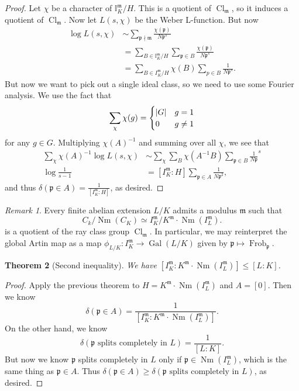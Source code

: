 \documentclass[leqno, openany]{memoir}
\newtheorem{thm}{Theorem}[section]
\theoremstyle{definition}
\theoremstyle{remark}
\newtheorem{rmk}[thm]{Remark}
\theoremstyle{plain}
\theoremstyle{definition}
\theoremstyle{remark}
\newcommand{\I}{\mathbb{I}}
\newcommand{\mf}[1]{\mathfrak{#1}}
\DeclareMathOperator{\Gal}{Gal}
\DeclareMathOperator{\Cl}{Cl}
\DeclareMathOperator{\Nm}{Nm}
\DeclareMathOperator{\Frob}{Frob}
\begin{document}
\begin{proof}
    Let $\chi$ be a character of $\I_K^{\mf{m}}/H$. This is a quotient of $\Cl_{\mf{m}}$, so it induces a quotient of $\Cl_{\mf{m}}$. Now let $L(s, \chi)$ be the Weber L-function. But now 
    \begin{align*} 
        \log L(s, \chi) &\sim \sum_{\mf{p} \nmid \mf{m}} \frac{\chi(\mf{p})}{N\mf{p}^s} \\ 
                        &= \sum_{B \in \I_K^{\mf{m}}/H} \sum_{\mf{p} \in B} \frac{\chi(\mf{p})}{N\mf{p}^s} \\
                        &= \sum_{B \in I_K^{\mf{m}}/H} \chi(B) \sum_{p \in B} \frac{1}{N \mf{p}^s}.
    \end{align*}
    But now we want to pick out a single ideal class, so we need to use some Fourier analysis. We use the fact that
    \[ \sum_{\chi} \chi(g) = \begin{cases}
        \abs{G} & g = 1 \\
        0 & g \neq 1
    \end{cases} \]
    for any $g \in G$. Multiplying ${\chi(A)}^{-1}$ and summing over all $\chi$, we see that
    \begin{align*}
        \sum_{\chi} {\chi(A)}^{-1} \log L(s, \chi) &\sim \sum_{\chi} \sum_B \chi(A^{-1}B) \sum_{\mf{p} \in B} \frac{1}{N \mf{p}}^s \\
        \log \frac{1}{s-1}                         &=[I_K^{\mf{m}}:H] \sum_{\mf{p} \in A} \frac{1}{N \mf{p}^2},
    \end{align*}
    and thus $\delta(\mf{p} \in A) = \frac{1}{[I_K^{\mf{m}}:H]}$, as desired.
\end{proof}

\begin{rmk}
    Every finite abelian extension $L/K$ admits a modulus $\mf{m}$ such that 
    \[ C_k/\Nm(C_K) \simeq I_K^{\mf{m}} / K^{\mf{m}} \cdot \Nm(I_L^{\mf{m}}). \]
    is a quotient of the ray class group $\Cl_{\mf{m}}$. In particular, we may reinterpret the global Artin map as a map $\phi_{L/K} \colon I_K^{\mf{m}} \to \Gal(L/K)$ given by $\mf{p} \mapsto \Frob_{\mf{p}}$.
\end{rmk}

\begin{thm}[Second inequality]
    We have $[I_K^{\mf{m}} : K^{\mf{m}} \cdot \Nm(I_L^{\mf{m}})] \leq [L:K]$.
\end{thm}

\begin{proof}
    Apply the previous theorem to $H = K^{\mf{m}} \cdot \Nm(I_L^{\mf{m}})$ and $A = [0]$. Then we know
    \[ \delta(\mf{p} \in A) = \frac{1}{[I_K^{\mf{m}} : K^{\mf{m}} \cdot \Nm(I_L^{\mf{m}})]}. \]
    On the other hand, we know
    \[ \delta(\mf{p}\text{ splits completely in }L) = \frac{1}{[L:K]}. \]
    But now we know $\mf{p}$ splits completely in $L$ only if $\mf{p} \in \Nm(I_L^{\mf{m}})$, which is the same thing as $\mf{p} \in A$. Thus $\delta(\mf{p} \in A) \geq \delta(\mf{p}\text{ splits completely in }L)$, as desired.
\end{proof}
\end{document}
